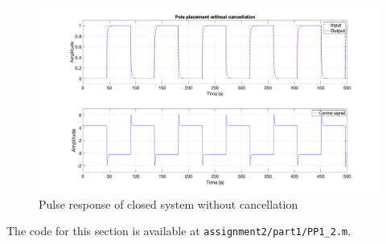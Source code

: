 \begin{figure}
	\centering
	\includegraphics[width=\textwidth]{images/pp22.png}
	\caption{Pulse response of closed system without cancellation}
	\label{fig:pp22}
\end{figure}

The code  for this section is available at \lstinline|assignment2/part1/PP1_2.m|. 

